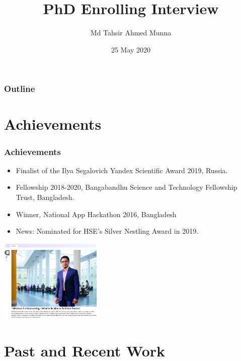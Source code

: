 \documentclass[smaller,aspectratio=169]{beamer}
\author{Md Tahsir Ahmed Munna}
\title{PhD Enrolling Interview}
\institute{Skoltech}
\date{25 May 2020}
\begin{document}
	\maketitle
	\begin{frame}
		\frametitle{Outline}
		\tableofcontents{}
	\end{frame}
	
	\section{Achievements}
	
	\begin{frame}
		\frametitle{Achievements}
		\begin{center}
			\begin{itemize}
				\item Finalist of the Ilya Segalovich Yandex Scientific Award 2019, Russia.
				\item Fellowship 2018-2020, Bangabandhu Science and Technology Fellowship Trust, Bangladesh.
				\item Winner, National App Hackathon 2016, Bangladesh
				\item News: Nominated for HSE’s Silver Nestling Award in 2019.
				
			\end{itemize}
			 \includegraphics[width=5cm]{img/prospective student.png}
		\end{center}
		
	\end{frame}
	
	
	\section{Past and Recent Work}
	
\end{document}
